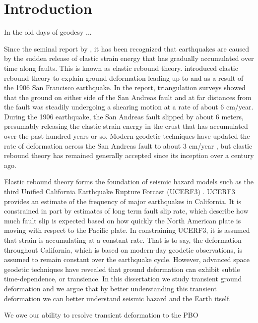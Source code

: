 \chapter{Introduction}


In the old days of geodesy ...



Since the seminal report by \citet{Reid1910}, it has been recognized
that earthquakes are caused by the sudden release of elastic strain
energy that has gradually accumulated over time along faults. This is
known as elastic rebound theory. \citet{Reid1910} introduced elastic
rebound theory to explain ground deformation leading up to and as a
result of the 1906 San Francisco earthquake. In the report,
triangulation surveys showed that the ground on either side of the San
Andreas fault and at far distances from the fault was steadily
undergoing a shearing motion at a rate of about 6 cm/year. During the
1906 earthquake, the San Andreas fault slipped by about 6 meters,
presumably releasing the elastic strain energy in the crust that has
accumulated over the past hundred years or so. Modern geodetic
techniques have updated the rate of deformation across the San Andreas
fault to about 3 cm/year \citep{Savage1973}, but elastic rebound
theory has remained generally accepted since its inception over a
century ago.

Elastic rebound theory forms the foundation of seismic hazard models
such as the third Unified California Earthquake Rupture Forcast
(UCERF3) \citep{Field2014}. UCERF3 provides an estimate of the
frequency of major earthquakes in California. It is constrained in
part by estimates of long term fault slip rate, which describe how
much fault slip is expected based on how quickly the North American
plate is moving with respect to the Pacific plate. In constraining
UCERF3, it is assumed that strain is accumulating at a constant rate.
That is to say, the deformation throughout California, which is based
on modern-day geodetic observations, is assumed to remain constant
over the earthquake cycle. However, advanced space geodetic techniques
have revealed that ground deformation can exhibit subtle
time-dependence, or transience. In this dissertation we study
transient ground deformation and we argue that by better understanding
this transient deformation we can better understand seismic hazard and
the Earth itself.

We owe our ability to resolve transient deformation to the PBO

